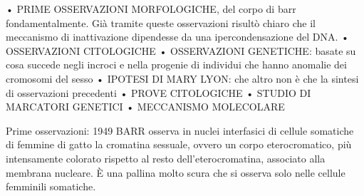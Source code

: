 \documentclass[11pt]{book}
\begin{document}
    • PRIME OSSERVAZIONI MORFOLOGICHE, del corpo di barr fondamentalmente. Già tramite queste osservazioni risultò chiaro che il meccanismo di inattivazione dipendesse da una ipercondensazione del DNA.
    • OSSERVAZIONI CITOLOGICHE
    • OSSERVAZIONI GENETICHE: basate su cosa succede negli incroci e nella progenie di individui che hanno anomalie dei cromosomi del sesso
    • IPOTESI DI MARY LYON: che altro non è che la sintesi di osservazioni precedenti 
    • PROVE CITOLOGICHE
    • STUDIO DI MARCATORI GENETICI 
    • MECCANISMO MOLECOLARE

Prime osservazioni: 1949 BARR osserva in nuclei interfasici di cellule somatiche di femmine di gatto la cromatina sessuale, ovvero un corpo eterocromatico, più intensamente colorato rispetto al resto dell’eterocromatina, associato alla membrana nucleare. È una pallina molto scura che si osserva solo nelle cellule femminili somatiche.
\end{document}
